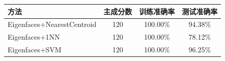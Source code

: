 \begin{tabular}{lccc}
\toprule
方法 & 主成分数 & 训练准确率 & 测试准确率 \\
\midrule
Eigenfaces+NearestCentroid & 120 & 100.00\% & 94.38\% \\
Eigenfaces+1NN & 120 & 100.00\% & 78.12\% \\
Eigenfaces+SVM & 120 & 100.00\% & 96.25\% \\
\bottomrule
\end{tabular}
